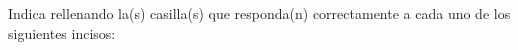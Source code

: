 \question[100] Indica rellenando la(s) casilla(s) que responda(n) correctamente a cada uno de los siguientes incisos:

\begin{parts}
        { \printanswers
        
        }
        
\end{parts}